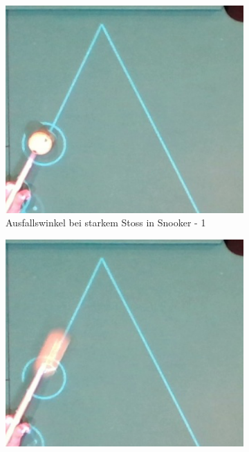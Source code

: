 \begin{figure}[h!]
    \centering
    \begin{subfigure}[b]{0.2\textwidth}
        \centering
        \includegraphics[width=1.0\linewidth]{../common/04_results/resources/simulation/rebound_angle_fast_snooker/00_rail_rebound_angle_fast_snooker_01.png}
        \caption{Ausfallswinkel bei starkem Stoss in Snooker - 1}
        \label{fig:rebound_angle_fast_snooker_1}
    \end{subfigure}
    \hfill
    \begin{subfigure}[b]{0.2\textwidth}
        \centering
        \includegraphics[width=1.0\linewidth]{../common/04_results/resources/simulation/rebound_angle_fast_snooker/00_rail_rebound_angle_fast_snooker_02.png}

\end{subfigure}
\end{figure}

